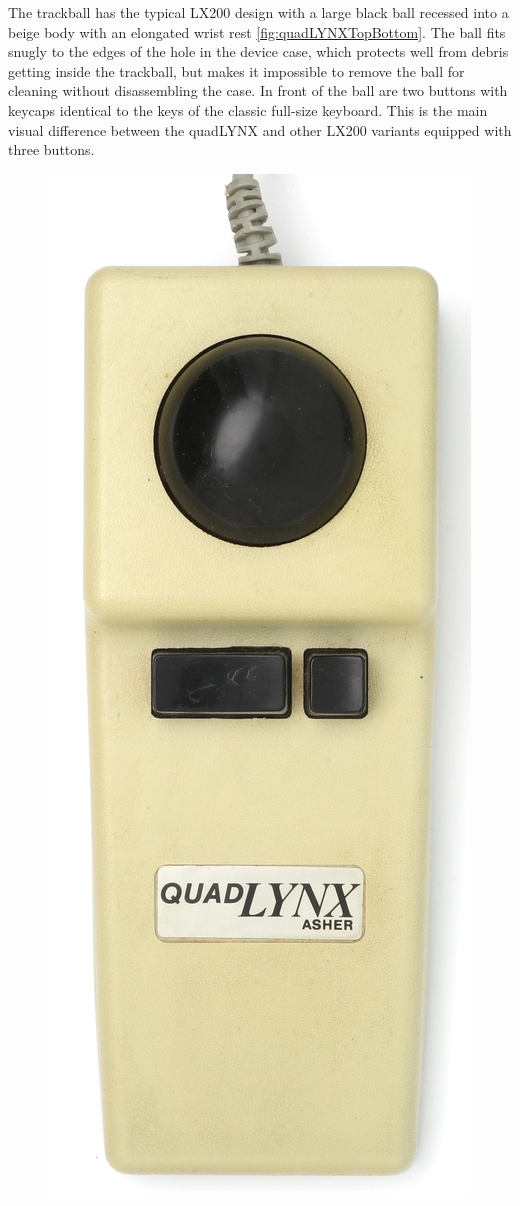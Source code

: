 \documentclass[11pt, a4paper]{article}
\begin{document}
The trackball has the typical LX200 design with a large black ball recessed into a beige body with an elongated wrist rest \ref{fig:quadLYNXTopBottom}. The ball fits snugly to the edges of the hole in the device case, which protects well from debris getting inside the trackball, but makes it impossible to remove the ball for cleaning without disassembling the case. In front of the ball are two buttons with keycaps identical to the keys of the classic full-size keyboard. This is the main visual difference between the quadLYNX and other LX200 variants equipped with three buttons.

\begin{figure}[h]
    \centering
    \includegraphics[scale=0.45]{1986_honeywell_asher_quadlynx_trackball/top_30.jpg}

\end{figure}
\end{document}

